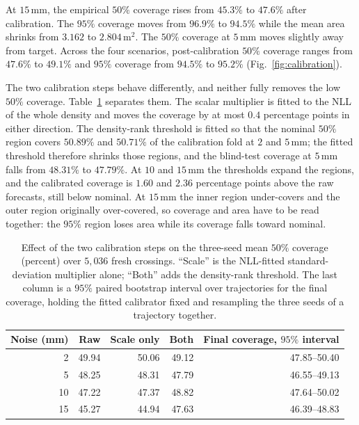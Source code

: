 \documentclass[11pt,a4paper]{article}
\begin{document}
At $15\,\mathrm{mm}$, the empirical $50\%$ coverage rises from $45.3\%$ to $47.6\%$ after calibration. The $95\%$ coverage moves from $96.9\%$ to $94.5\%$ while the mean area shrinks from $3.162$ to $2.804\,\mathrm{m^2}$. The $50\%$ coverage at $5\,\mathrm{mm}$ moves slightly away from target. Across the four scenarios, post-calibration $50\%$ coverage ranges from $47.6\%$ to $49.1\%$ and $95\%$ coverage from $94.5\%$ to $95.2\%$ (Fig.~\ref{fig:calibration}).

The two calibration steps behave differently, and neither fully removes the low $50\%$ coverage. Table~\ref{tab:calsteps} separates them. The scalar multiplier is fitted to the NLL of the whole density and moves the coverage by at most $0.4$ percentage points in either direction. The density-rank threshold is fitted so that the nominal $50\%$ region covers $50.89\%$ and $50.71\%$ of the calibration fold at $2$ and $5\,\mathrm{mm}$; the fitted threshold therefore shrinks those regions, and the blind-test coverage at $5\,\mathrm{mm}$ falls from $48.31\%$ to $47.79\%$. At $10$ and $15\,\mathrm{mm}$ the thresholds expand the regions, and the calibrated coverage is $1.60$ and $2.36$ percentage points above the raw forecasts, still below nominal. At $15\,\mathrm{mm}$ the inner region under-covers and the outer region originally over-covered, so coverage and area have to be read together: the $95\%$ region loses area while its coverage falls toward nominal.

\begin{table}[htbp]
  \centering
  \small
  \caption{Effect of the two calibration steps on the three-seed mean $50\%$ coverage (percent) over $5{,}036$ fresh crossings. ``Scale'' is the NLL-fitted standard-deviation multiplier alone; ``Both'' adds the density-rank threshold. The last column is a $95\%$ paired bootstrap interval over trajectories for the final coverage, holding the fitted calibrator fixed and resampling the three seeds of a trajectory together.}
  \label{tab:calsteps}
  \begin{tabular}{rrrrr}
    \toprule
    Noise (mm) & Raw & Scale only & Both & Final coverage, $95\%$ interval \\
    \midrule
    2  & 49.94 & 50.06 & 49.12 & 47.85--50.40 \\
    5  & 48.25 & 48.31 & 47.79 & 46.55--49.13 \\
    10 & 47.22 & 47.37 & 48.82 & 47.64--50.02 \\
    15 & 45.27 & 44.94 & 47.63 & 46.39--48.83 \\
    \bottomrule
  \end{tabular}
\end{table}
\end{document}
